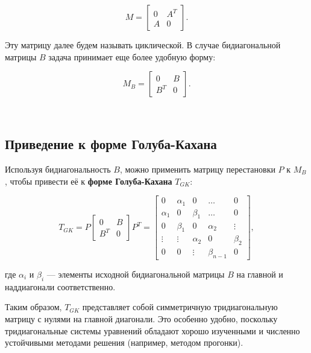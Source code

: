 \documentclass[12pt, a4paper]{report}
\theoremstyle{note}
\begin{document}
\begin{equation}
M = \begin{bmatrix} 0 & A^T \\ A & 0 \end{bmatrix}.
\end{equation}

Эту матрицу далее будем называть циклической. В случае бидиагональной матрицы \( B \) задача принимает еще более удобную форму:

\begin{equation}
M_B = \begin{bmatrix} 0 & B \\ B^T & 0 \end{bmatrix}.
\end{equation}

~\cite{Golub2013}


\subsection{Приведение к форме Голуба-Кахана}

Используя бидиагональность \( B \), можно применить матрицу перестановки \( P \) к \( M_B \), чтобы привести её к \textbf{форме Голуба-Кахана} \( T_{GK} \):

\begin{equation}
T_{GK} = P \begin{bmatrix} 0 & B \\ B^T & 0 \end{bmatrix} P^T = 
\begin{bmatrix}
0 & \alpha_1 & 0 & \dots & 0 \\
\alpha_1 & 0 & \beta_1 & \dots & 0 \\
0 & \beta_1 & 0 & \alpha_2 & \vdots \\
\vdots & \vdots & \alpha_2 & 0 & \beta_2 \\
0 & 0 & \vdots & \beta_{n-1} & 0
\end{bmatrix},
\end{equation}

где \( \alpha_i \) и \( \beta_i \) — элементы исходной бидиагональной матрицы \( B \) на главной и наддиагонали соответственно. 

Таким образом, \( T_{GK} \) представляет собой симметричную тридиагональную матрицу с нулями на главной диагонали. Это особенно удобно, поскольку тридиагональные системы уравнений обладают хорошо изученными и численно устойчивыми методами решения (например, методом прогонки).
\end{document}
